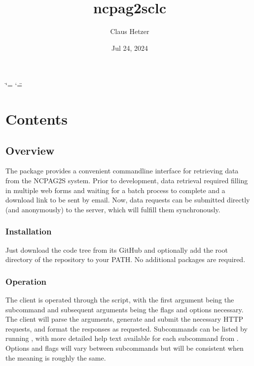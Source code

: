 \documentclass[letterpaper,10pt,english]{sphinxmanual}
\title{ncpag2s\sphinxhyphen{}clc}
\date{Jul 24, 2024}
\author{Claus Hetzer}
\begin{document}
\ifdefined\shorthandoff
  \ifnum\catcode`\=\string=\active\shorthandoff{=}\fi
  \ifnum\catcode`\"=\active{}\fi
\fi

\pagestyle{empty}
\sphinxmaketitle
\pagestyle{plain}
\sphinxtableofcontents
\pagestyle{normal}
\label{\detokenize{index::doc}}



\chapter{Contents}
\label{\detokenize{index:contents}}
\sphinxstepscope


\section{Overview}
\label{\detokenize{overview:overview}}\label{\detokenize{overview:id1}}\label{\detokenize{overview::doc}}
\sphinxAtStartPar
The  package provides a convenient command\sphinxhyphen{}line interface for retrieving data from the NCPA\sphinxhyphen{}G2S system.  Prior to development, data retrieval required filling in multiple web forms and waiting for a batch process to complete and a download link to be sent by email.  Now, data requests can be submitted directly (and anonymously) to the server, which will fulfill them synchronously.


\subsection{Installation}
\label{\detokenize{overview:installation}}
\sphinxAtStartPar
Just download the code tree from its GitHub  and optionally add the root directory of the repository to your PATH. No additional packages are required.


\subsection{Operation}
\label{\detokenize{overview:operation}}
\sphinxAtStartPar
The client is operated through the  script, with the first argument being the subcommand and subsequent arguments being the flags and options necessary. The client will parse the arguments, generate and submit the necessary HTTP requests, and format the responses as requested.  Subcommands can be listed by running , with more detailed help text available for each subcommand from .  Options and flags will vary between subcommands but will be consistent when the meaning is roughly the same.
\end{document}
